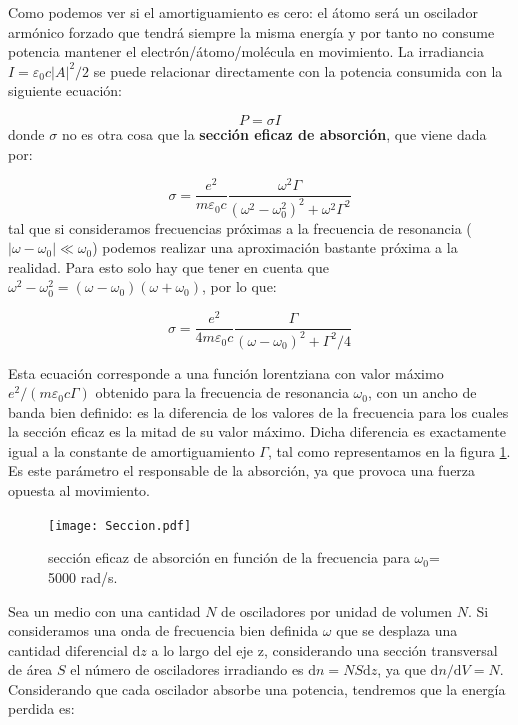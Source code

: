 \documentclass[12pt]{article}
\newcommand{\D}{\mathrm{d}}
\numberwithin{equation}{section}
\numberwithin{figure}{section}
\begin{document}
Como podemos ver si el amortiguamiento es cero: el átomo será un oscilador armónico forzado que tendrá siempre la misma energía y por tanto no consume potencia mantener el electrón/átomo/molécula en movimiento. La irradiancia $I=\varepsilon_0 c |A|^2 / 2$ se puede relacionar directamente con la potencia consumida con la siguiente ecuación:

\begin{equation}
P = \sigma I
\end{equation}
donde $\sigma$ no es otra cosa que la \textbf{sección eficaz de absorción}, que viene dada por:

\begin{equation}
\sigma = \dfrac{e^2}{m \varepsilon_0 c} \dfrac{\omega^2 \Gamma}{(\omega^2-\omega_0^2)^2 + \omega^2 \Gamma^2}
\end{equation}
tal que si consideramos frecuencias próximas a la frecuencia de resonancia ( $|\omega-\omega_0| \ll \omega_0$) podemos realizar una aproximación bastante próxima a la realidad. Para esto solo hay que tener en cuenta que $\omega^2-\omega_0^2=(\omega-\omega_0)(\omega+\omega_0)$, por lo que:

\begin{equation}
\sigma = \dfrac{e^2}{4 m \varepsilon_0 c} \dfrac{ \Gamma}{(\omega - \omega_0)^2 +  \Gamma^2/4}
\end{equation}

Esta ecuación corresponde a una función lorentziana con valor máximo $e^2 / (m \varepsilon_0 c \Gamma)$ obtenido para la frecuencia de resonancia $\omega_0$, con un ancho de banda bien definido: es la diferencia de los valores de la frecuencia para los cuales la sección eficaz es la mitad de su valor máximo. Dicha diferencia es exactamente igual a la constante de amortiguamiento $\Gamma$, tal como representamos en la figura \ref{Fig:7.3.02}. Es este parámetro el responsable de la absorción, ya que provoca una fuerza opuesta al movimiento. \\

\begin{figure}[h!] \centering
\texttt{[image: Seccion.pdf]}
\caption{sección eficaz de absorción en función de la frecuencia para $\omega_0$= 5000 rad/s.}
\label{Fig:7.3.02}
\end{figure}

Sea un medio con una cantidad $N$ de osciladores por unidad de volumen $N$. Si consideramos una onda de frecuencia bien definida $\omega$ que se desplaza una cantidad diferencial $\D z$ a lo largo del eje z, considerando una sección transversal de área $S$ el número de osciladores irradiando es $\D n = N S \D z$, ya que $\D n / \D V = N$. Considerando que cada oscilador absorbe una potencia, tendremos que la energía perdida es:
\end{document}

